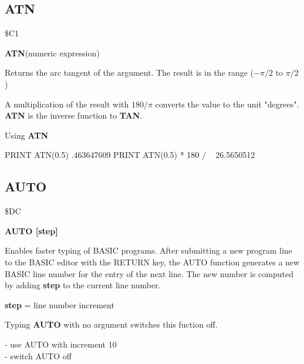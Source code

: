 
\newpage
\subsection{ATN}
\begin{description}[leftmargin=3cm,style=nextline]
\item [Token:] \$C1
\item [Format:] {\bf ATN}(numeric expression)
\item [Usage:] Returns the arc tangent of the
               argument.
               The result is in the range ($-\pi/2$ to $\pi/2$)

\item [Remarks:]
               A multiplication of the result with $180/\pi$
               converts the value to the unit "degrees".
               {\bf ATN} is the inverse function to {\bf TAN}.
\item [Example:] Using {\bf ATN}
\begin{screenoutput}
  PRINT ATN(0.5)
   .463647609
  PRINT ATN(0.5) * 180 / ~
   26.5650512
\end{screenoutput}
\end{description}


\newpage
\subsection{AUTO}
\begin{description}[leftmargin=3cm,style=nextline]
\item [Token:] \$DC
\item [Format:]
  {\bf AUTO [step]}
\item [Usage:] Enables faster typing of BASIC programs.
  After submitting a new program line to the BASIC editor with
  the RETURN key, the AUTO function generates a new BASIC line
  number for the entry of the next line. The new number is
  computed by adding {\bf step} to the current line number.

  {\bf step} = line number increment

  Typing {\bf AUTO} with no argument switches this fuction off.

\item [Example:]  - use AUTO with increment 10 \\
                   - switch AUTO off
\end{description}

